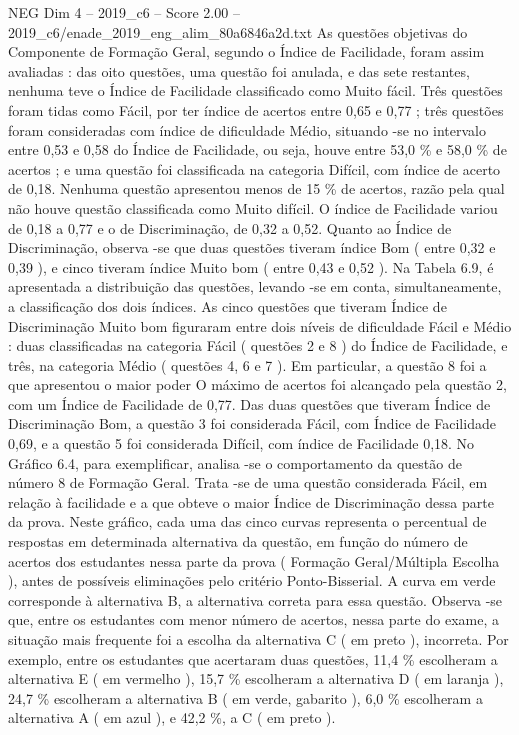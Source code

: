 \begin{textsample}{NEG Dim 4 – 2019\_c6 – Score 2.00 – 2019\_c6/enade\_2019\_eng\_alim\_80a6846a2d.txt}
As questões objetivas do Componente de Formação Geral, segundo o Índice de Facilidade, foram assim avaliadas : das oito questões, uma questão foi anulada, e das sete restantes, nenhuma teve o Índice de Facilidade classificado como Muito fácil.
Três questões foram tidas como Fácil, por ter índice de acertos entre 0,65 e 0,77 ; três questões foram consideradas com índice de dificuldade Médio, situando -se no intervalo entre 0,53 e 0,58 do Índice de Facilidade, ou seja, houve entre 53,0 \% e 58,0 \% de acertos ; e uma questão foi classificada na categoria Difícil, com índice de acerto de 0,18.
Nenhuma questão apresentou menos de 15 \% de acertos, razão pela qual não houve questão classificada como Muito difícil.
O índice de Facilidade variou de 0,18 a 0,77 e o de Discriminação, de 0,32 a 0,52.
Quanto ao Índice de Discriminação, observa -se que duas questões tiveram índice Bom ( entre 0,32 e 0,39 ), e cinco tiveram índice Muito bom ( entre 0,43 e 0,52 ).
Na Tabela 6.9, é apresentada a distribuição das questões, levando -se em conta, simultaneamente, a classificação dos dois índices.
As cinco questões que tiveram Índice de Discriminação Muito bom figuraram entre dois níveis de dificuldade Fácil e Médio : duas classificadas na categoria Fácil ( questões 2 e 8 ) do Índice de Facilidade, e três, na categoria Médio ( questões 4, 6 e 7 ).
Em particular, a questão 8 foi a que apresentou o maior poder O máximo de acertos foi alcançado pela questão 2, com um Índice de Facilidade de 0,77.
Das duas questões que tiveram Índice de Discriminação Bom, a questão 3 foi considerada Fácil, com Índice de Facilidade 0,69, e a questão 5 foi considerada Difícil, com índice de Facilidade 0,18.
No Gráfico 6.4, para exemplificar, analisa -se o comportamento da questão de número 8 de Formação Geral.
Trata -se de uma questão considerada Fácil, em relação à facilidade e a que obteve o maior Índice de Discriminação dessa parte da prova.
Neste gráfico, cada uma das cinco curvas representa o percentual de respostas em determinada alternativa da questão, em função do número de acertos dos estudantes nessa parte da prova ( Formação Geral/Múltipla Escolha ), antes de possíveis eliminações pelo critério Ponto-Bisserial.
A curva em verde corresponde à alternativa B, a alternativa correta para essa questão.
Observa -se que, entre os estudantes com menor número de acertos, nessa parte do exame, a situação mais frequente foi a escolha da alternativa C ( em preto ), incorreta.
Por exemplo, entre os estudantes que acertaram duas questões, 11,4 \% escolheram a alternativa E ( em vermelho ), 15,7 \% escolheram a alternativa D ( em laranja ), 24,7 \% escolheram a alternativa B ( em verde, gabarito ), 6,0 \% escolheram a alternativa A ( em azul ), e 42,2 \%, a C ( em preto ).

\end{textsample}
